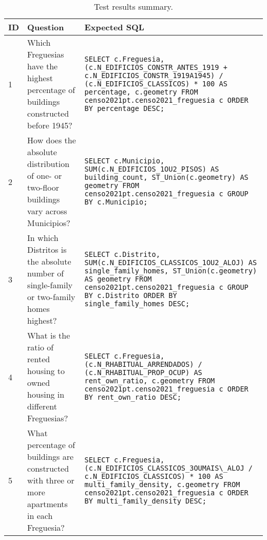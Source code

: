{\scriptsize



\bgroup
{}
\begin{xltabular}{\textwidth}{|p{0.05\textwidth}p{0.3\textwidth}p{0.55\textwidth}|}
    \caption{Test results summary.}
    \label{tab:evaluation_questions}\\
    \toprule
       ID & Question & Expected SQL \\
    \midrule
{}\label{question:1}1 & Which Freguesias have the highest percentage of buildings constructed before 1945? & \lstinline!SELECT c.Freguesia, (c.N_EDIFICIOS_CONSTR_ANTES_1919 + c.N_EDIFICIOS_CONSTR_1919A1945) / (c.N_EDIFICIOS_CLASSICOS) * 100 AS percentage, c.geometry FROM censo2021pt.censo2021_freguesia c ORDER BY percentage DESC;! \\
\label{question:2}2 & How does the absolute distribution of one- or two-floor buildings vary across Municipios? & \lstinline!SELECT c.Municipio, SUM(c.N_EDIFICIOS_1OU2_PISOS) AS building_count, ST_Union(c.geometry) AS geometry FROM censo2021pt.censo2021_freguesia c GROUP BY c.Municipio;! \\
\label{question:3}3 & In which Distritos is the absolute number of single-family or two-family homes highest? & \lstinline!SELECT c.Distrito, SUM(c.N_EDIFICIOS_CLASSICOS_1OU2_ALOJ) AS single_family_homes, ST_Union(c.geometry) AS geometry FROM censo2021pt.censo2021_freguesia c GROUP BY c.Distrito ORDER BY single_family_homes DESC;! \\
\label{question:4}4 & What is the ratio of rented housing to owned housing in different Freguesias? & \lstinline!SELECT c.Freguesia, (c.N_RHABITUAL_ARRENDADOS) / (c.N_RHABITUAL_PROP_OCUP) AS rent_own_ratio, c.geometry FROM censo2021pt.censo2021_freguesia c ORDER BY rent_own_ratio DESC;! \\
\label{question:5}5 & What percentage of buildings are constructed with three or more apartments in each Freguesia? & \lstinline!SELECT c.Freguesia, (c.N_EDIFICIOS_CLASSICOS_3OUMAIS\_ALOJ / c.N_EDIFICIOS_CLASSICOS) * 100 AS multi_family_density, c.geometry FROM censo2021pt.censo2021_freguesia c ORDER BY multi_family_density DESC;! \\

\end{xltabular}}
